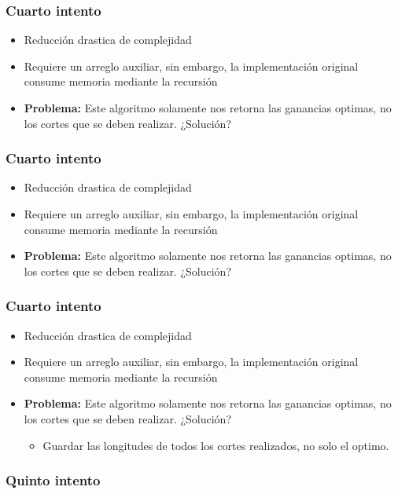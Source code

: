 \documentclass{beamer}
\begin{document}
\begin{frame}
\frametitle{Cuarto intento}
\begin{itemize}
    \item{Reducci\'on drastica de complejidad}
    \item{Requiere un arreglo auxiliar, sin embargo,
    la implementaci\'on original consume memoria mediante la recursi\'on}
    \item{{\bf Problema:} Este algoritmo solamente nos retorna las ganancias
    optimas, no los cortes que se deben realizar. ¿Soluci\'on?}
\end{itemize}
\end{frame}

\begin{frame}
    \frametitle{Cuarto intento}
    \begin{itemize}
        \item{Reducci\'on drastica de complejidad}
        \item{Requiere un arreglo auxiliar, sin embargo,
        la implementaci\'on original consume memoria mediante la recursi\'on}
        \item{{\bf Problema:} Este algoritmo solamente nos retorna las ganancias
        optimas, no los cortes que se deben realizar. ¿Soluci\'on?}
    \end{itemize}
\end{frame}

\begin{frame}
    \frametitle{Cuarto intento}
    \begin{itemize}
        \item{Reducci\'on drastica de complejidad}
        \item{Requiere un arreglo auxiliar, sin embargo,
        la implementaci\'on original consume memoria mediante la recursi\'on}
        \item{{\bf Problema:} Este algoritmo solamente nos retorna las ganancias
        optimas, no los cortes que se deben realizar. ¿Soluci\'on?
        \begin{itemize}
            \item{Guardar las longitudes de todos los cortes realizados, no
            solo el optimo.}
        \end{itemize}
        }
    \end{itemize}
\end{frame}

\begin{frame}
    \frametitle{Quinto intento}
\end{frame}
\end{document}
